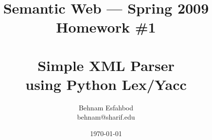 \documentclass{article}
\newcommand{\problem}[1]{\section*{Problem #1}}
\newcommand{\subproblem}[1]{\subsection*{#1}}
\begin{document}
\title{Semantic Web --- Spring 2009\\Homework \#1\\~\\Simple XML Parser\\using Python Lex/Yacc}
\author{Behnam Esfahbod\\behnam@sharif.edu}
\date{\today}
\maketitle













%


\end{document}
